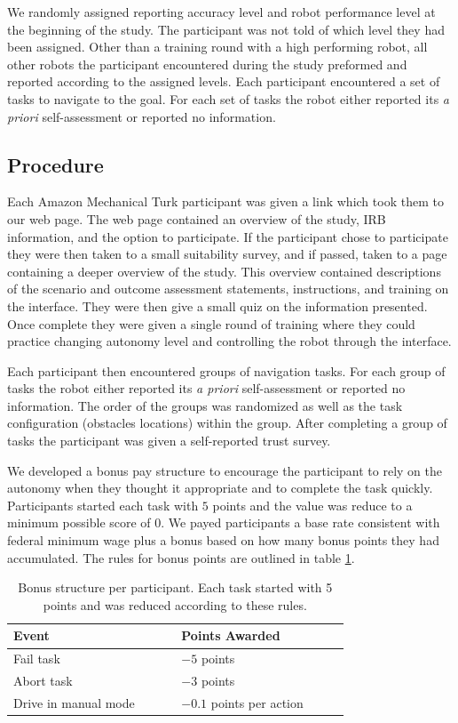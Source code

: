 \documentclass[aaai]{article}
\begin{document}
We randomly assigned reporting accuracy level and robot performance level at the beginning of the study. The participant was not told of which level they had been assigned. Other than a training round with a high performing robot, all other robots the participant encountered during the study preformed and reported according to the assigned levels. Each participant encountered a set of tasks to navigate to the goal. For each set of tasks the robot either reported its \textit{a priori} self-assessment or reported no information.

\subsection{Procedure}
Each Amazon Mechanical Turk participant was given a link which took them to our web page. The web page contained an overview of the study, IRB information, and the option to participate. If the participant chose to participate they were then taken to a small suitability survey, and if passed, taken to a page containing a deeper overview of the study. This overview contained descriptions of the scenario and outcome assessment statements, instructions, and training on the interface. They were then give a small quiz on the information presented. Once complete they were given a single round of training where they could practice changing autonomy level and controlling the robot through the interface.

Each participant then encountered groups of navigation tasks. For each group of tasks the robot either reported its \textit{a priori} self-assessment or reported no information. The order of the groups was randomized as well as the task configuration (obstacles locations) within the group. After completing a group of tasks the participant was given a self-reported trust survey.

We developed a bonus pay structure to encourage the participant to rely on the autonomy when they thought it appropriate and to complete the task quickly. Participants started each task with $5$ points and the value was reduce to a minimum possible score of $0$. We payed participants a base rate consistent with federal minimum wage plus a bonus based on how many bonus points they had accumulated. The rules for bonus points are outlined in table \ref{BONUS}.

\begin{table}[h]
\begin{center}
\begin{tabular}{|p{0.4\linewidth} || p{0.4\linewidth}|}
\hline
\textbf{Event} & \textbf{Points Awarded} \\
\hline
\hline
Fail task & $-5$ points\\
\hline
Abort task & $-3$ points \\
\hline
Drive in manual mode & $-0.1$ points per action \\
\hline
\end{tabular}
\end{center}
\caption{Bonus structure per participant. Each task started with 5 points and was reduced according to these rules.}
\label{BONUS}
\end{table}
\end{document}
